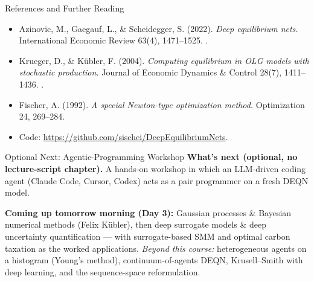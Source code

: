 \documentclass[aspectratio=169,11pt]{beamer}
\begin{document}
\begin{frame}{References and Further Reading}
\small
\begin{itemize}\itemsep3pt
    \item Azinovic, M., Gaegauf, L., \& Scheidegger, S. (2022). \emph{Deep equilibrium nets.} International Economic Review 63(4), 1471--1525.  .

    \item Krueger, D., \& K\"ubler, F. (2004). \emph{Computing equilibrium in OLG models with stochastic production.} Journal of Economic Dynamics \& Control 28(7), 1411--1436.  .

    \item Fischer, A. (1992). \emph{A special Newton-type optimization method.} Optimization 24, 269--284.  

    \item Code: \scriptsize\url{https://github.com/sischei/DeepEquilibriumNets}.
\end{itemize}
\end{frame}


\begin{frame}{Optional Next: Agentic-Programming Workshop}
\footnotesize
\textbf{What's next (optional, no lecture-script chapter).}  A hands-on workshop in which an LLM-driven coding agent (Claude Code, Cursor, Codex) acts as a pair programmer on a fresh DEQN model.

\vspace{0.4em}
\textbf{Coming up tomorrow morning (Day 3):} Gaussian processes \& Bayesian numerical methods (Felix K\"ubler), then deep surrogate models \& deep uncertainty quantification --- with surrogate-based SMM and optimal carbon taxation as the worked applications.  \emph{Beyond this course:} heterogeneous agents on a histogram (Young's method), continuum-of-agents DEQN, Krusell--Smith with deep learning, and the sequence-space reformulation.
\end{frame}
\end{document}
